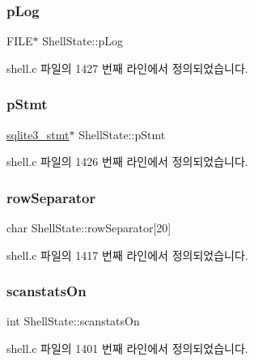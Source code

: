 \subsubsection{\texorpdfstring{p\+Log}{pLog}}
{\footnotesize\ttfamily F\+I\+LE$\ast$ Shell\+State\+::p\+Log}



shell.\+c 파일의 1427 번째 라인에서 정의되었습니다.

\mbox{\label{struct_shell_state_a443b930c7001c9b669728b917c2f5587}} 
\subsubsection{\texorpdfstring{p\+Stmt}{pStmt}}
{\footnotesize\ttfamily \hyperlink{sqlite3_8h_af2a033da1327cdd77f0a174a09aedd0c}{sqlite3\+\_\+stmt}$\ast$ Shell\+State\+::p\+Stmt}



shell.\+c 파일의 1426 번째 라인에서 정의되었습니다.

\mbox{\label{struct_shell_state_a576a4b6fd62786683bafb6c7631eae6f}} 
\subsubsection{\texorpdfstring{row\+Separator}{rowSeparator}}
{\footnotesize\ttfamily char Shell\+State\+::row\+Separator\mbox{[}20\mbox{]}}



shell.\+c 파일의 1417 번째 라인에서 정의되었습니다.

\mbox{\label{struct_shell_state_aac5055c5404f54e65f52dfdab67cc49d}} 
\subsubsection{\texorpdfstring{scanstats\+On}{scanstatsOn}}
{\footnotesize\ttfamily int Shell\+State\+::scanstats\+On}



shell.\+c 파일의 1401 번째 라인에서 정의되었습니다.

